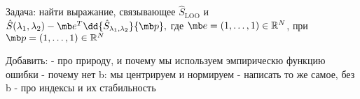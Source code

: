
Задача: найти выражание, связывающее $\hat{S}_{\text{LOO}}$ и $\hat S(\lambda_1, \lambda_2) - \mb e^T\dd{\hat{S}_{\lambda_1, \lambda_2}}{\mb p},$ где $\mb e = (1, \ldots, 1) \in \mathbb R^N$, при $\mb p = (1, \ldots, 1) \in \mathbb R^N$


Добавить:
- про природу, и почему мы используем эмпирическю функцию ошибки
- почему нет b: мы центрируем и нормируем
- написать то же самое, без b
- про индексы и их стабильность
